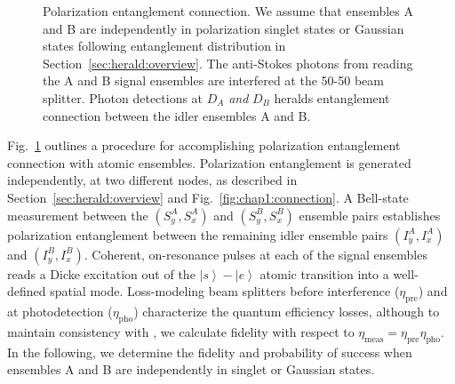 \documentclass[aps,twocolumn,secnumarabic,amsmath,amssymb,pra,groupedaddress,
showpacs, showkeys]{revtex4-1}
\newcommand{\ket}[1]{\left|#1\right\rangle}
\newcommand{\pna}[1]{\left(#1\right)}
\begin{document}
\begin{figure}[t]
	\centering
	\resizebox{5.00in}{!}{}
	\caption{Polarization entanglement connection. We assume that ensembles A and B are independently in polarization singlet states or Gaussian states following entanglement distribution in Section~\ref{sec:herald:overview}. The anti-Stokes photons from reading the A and B signal ensembles are interfered at the 50-50 beam splitter. Photon detections at $D_A$ \emph{and} $D_B$ heralds entanglement connection between the idler ensembles A and B.
	\label{fig:entanglement_connection}}
\end{figure}

Fig.~\ref{fig:entanglement_connection} outlines a procedure for accomplishing
polarization entanglement connection with atomic ensembles. Polarization
entanglement is generated independently, at two different nodes, as described
in Section~\ref{sec:herald:overview} and Fig.~\ref{fig:chap1:connection}. A
Bell-state measurement between the $\pna{S_y^A,S_x^A}$ and $\pna{S_y^B,S_x^B}$
ensemble pairs establishes polarization entanglement between the remaining
idler ensemble pairs $\pna{I_y^A,I_x^A}$ and $\pna{I_y^B,I_x^B}$. Coherent,
on-resonance pulses at each of the signal ensembles reads a Dicke excitation
out of the $\ket{s}-\ket{e}$ atomic transition into a well-defined spatial
mode. Loss-modeling beam splitters before interference ($\eta_{\textrm{pre}}$)
and at photodetection ($\eta_{\textrm{pho}}$) characterize the quantum
efficiency losses, although to maintain consistency with
\cite{PhysRevA.73.042303}, we calculate fidelity with respect to
$\eta_{\textrm{meas}}=\eta_{\textrm{pre}}\eta_{\textrm{pho}}$. In the
following, we determine the fidelity and probability of success when ensembles
A and B are independently in singlet or Gaussian states.
\end{document}
